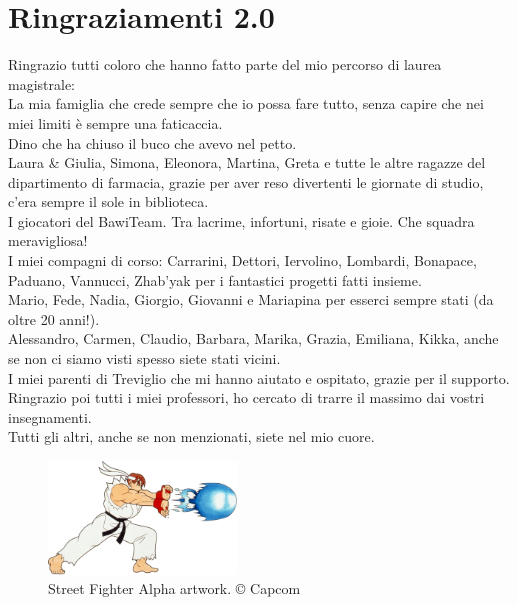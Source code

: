 %
%

\chapter*{Ringraziamenti 2.0}

Ringrazio tutti coloro che hanno fatto parte del mio percorso di laurea magistrale:\\
La mia famiglia che crede sempre che io possa fare tutto, senza capire che nei miei limiti è sempre una faticaccia.\\
Dino che ha chiuso il buco che avevo nel petto.\\
Laura \& Giulia, Simona, Eleonora, Martina, Greta e tutte le altre ragazze del dipartimento di farmacia, grazie per aver reso divertenti le giornate di studio, c'era sempre il sole in biblioteca.\\
I giocatori del BawiTeam. Tra lacrime, infortuni, risate e gioie. Che squadra meravigliosa!\\
I miei compagni di corso: Carrarini, Dettori, Iervolino, Lombardi, Bonapace, Paduano, Vannucci, Zhab'yak per i fantastici progetti fatti insieme.\\
Mario, Fede, Nadia, Giorgio, Giovanni e Mariapina per esserci sempre stati (da oltre 20 anni!).\\
Alessandro, Carmen, Claudio, Barbara, Marika, Grazia, Emiliana, Kikka, anche se non ci siamo visti spesso siete stati vicini.\\
I miei parenti di Treviglio che mi hanno aiutato e ospitato, grazie per il supporto.\\
Ringrazio poi tutti i miei professori, ho cercato di trarre il massimo dai vostri insegnamenti.\\
Tutti gli altri, anche se non menzionati, siete nel mio cuore.

\vspace*{\fill}

\begin{figure}[H]
	\centering
	\includegraphics[width=5cm]{immagini/hadoken}
	\caption{Street Fighter Alpha artwork. © Capcom}
	\label{fig:hadoken}
\end{figure}
